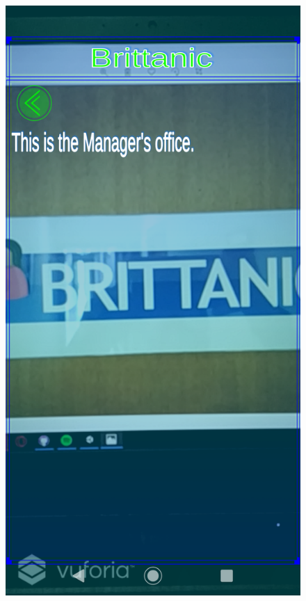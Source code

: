 \documentclass{aifyp}
\begin{document}
\begin{appendices}
\begin{figure}[H]
\begin{minipage}{.5\textwidth}
          \label{fig:AugmentationMenu}
        \end{minipage}%
        \begin{minipage}{.5\textwidth}
          \centering
          \includegraphics[scale=0.2]{Images/Chapter5/Impl8.png}

\end{minipage}
\end{figure}
\end{appendices}
\end{document}
